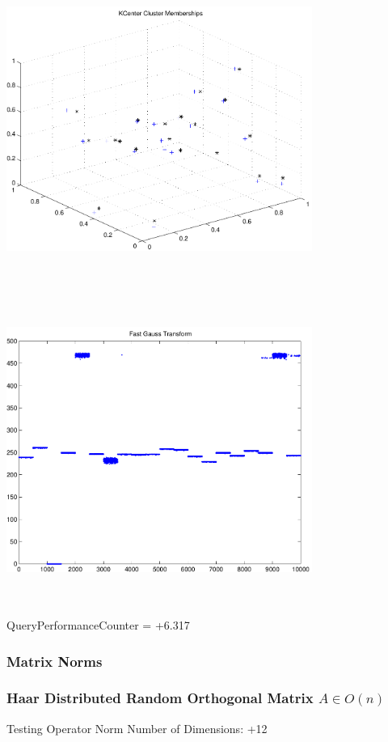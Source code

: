 \documentclass[9pt]{article}
\theoremstyle{plain}
\theoremstyle{definition}
\theoremstyle{remark}
\numberwithin{equation}{section}
\begin{document}
\includegraphics[width=10.0cm,height=10.0cm]{KCenterClusterMemberships_20_Centers.pdf}

\includegraphics[width=10.0cm,height=10.0cm]{FGT20_Centers.pdf}

QueryPerformanceCounter  =  +6.317
\subsubsection{Matrix Norms}
\subsubsection{Haar Distributed Random Orthogonal Matrix $A \in O(n)$}
 Testing Operator Norm
Number of Dimensions: +12
\end{document}
